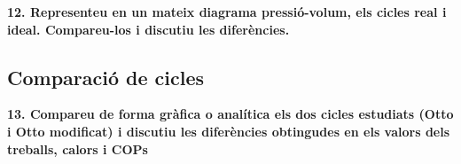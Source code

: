 \documentclass[a4paper]{article}
\begin{document}
\textbf{12. Representeu en un mateix diagrama pressió-volum, els cicles real i ideal. Compareu-los i discutiu les diferències.}

\subsection*{Comparació de cicles}

\textbf{13. Compareu de forma gràfica o analítica els dos cicles estudiats (Otto i Otto modificat) i discutiu les diferències obtingudes en els valors dels treballs, calors i COPs}
\end{document}
